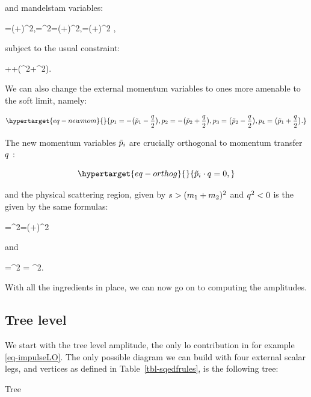 \documentclass[
  10pt,
  a4paper,
  DIV=11,
  numbers=noendperiod,
  twoside]{scrreprt}
\let\[\relax \let\]\relax %
\DeclareRobustCommand{\[}{\begin{equation}}
\DeclareRobustCommand{\]}{\end{equation}}
\begin{document}
and mandelstam variables:

\[
 \mands=(\emom[1]+\emom[2])^2,\quad \mandt=\tm^2=(\emom[1]+\emom[4])^2,\quad \mandu=(\emom[1]+\emom[3])^2   ,
\]

subject to the usual constraint:

\[
\mands+\mandt+(\mass[1]^2+\mass[2]^2).
\]

We can also change the external momentum variables to ones more amenable
to the soft limit, namely:

\begin{equation}\protect\hypertarget{eq-newmom}{}{
\emom[1]=-\pa[\big]{\semom[1]-\Half[\tm]}, \emom[2]=-\pa[\big]{\semom[2]+\Half[\tm]}, \emom[3]=\pa[\big]{\semom[2]-\Half[\tm]}, \emom[4]=\pa[\big]{\semom[1]+\Half[\tm]} .
}\label{eq-newmom}\end{equation}

The new momentum variables \(\semom[i]\) are crucially orthogonal to
momentum transfer \(\tm\) :

\begin{equation}\protect\hypertarget{eq-orthog}{}{
\semom[i]\cdot\tm=0,
}\label{eq-orthog}\end{equation}

and the physical scattering region, given by
\(\mands>(\mass[1]+\mass[2])^2\) and \(\tm^2<0\) is the given by the
same formulas:

\[
\mands=\pa[\Big]{-\pa[\big]{\semom[1]-\Half[\tm]}-\pa[\big]{\semom[2]+\Half[\tm]}}^2=(\semom[1]+\semom[2])^2
\]

and

\[
\mandt=\pa[\Big]{-\pa[\big]{\semom[1]-\Half[\tm]}+\semom[1]+\Half[\tm]}^2 = \tm^2.
\]

With all the ingredients in place, we can now go on to computing the
amplitudes.

\hypertarget{tree-level}{%
\subsection{Tree level}\label{tree-level}}

We start with the tree level amplitude, the only \gls{lo} contribution
in for example \ref{eq-impulseLO}. The only possible diagram we can
build with four external scalar legs, and vertices as defined in
Table~\ref{tbl-sqedfrules}, is the following tree:

{
\makeatletter
\def\LT@makecaption#1#2#3{%
  \noalign{\smash{\hbox{\kern\textwidth\rlap{\kern\marginparsep
  \parbox[t]{\marginparwidth}{%
    \footnotesize{%
      \vspace{(1.1\baselineskip)}
    #1{#2: }\ignorespaces #3}}}}}}%
    }
\makeatother



Tree

}
\end{document}
